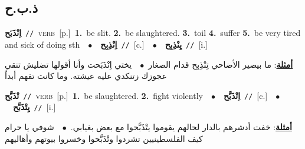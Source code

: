 \documentclass[10pt,a4paper,twoside]{article} %
\begin{document}
\begin{multicols}{2}
\vspace{-3mm}
\subsection*{\color{blue}\foreignlanguage{arabic}{ذ.ب.ح}\color{blue}{}} 

{\setlength\topsep{0pt}\textbf{\foreignlanguage{arabic}{اِنْذَبَح}}\ {\color{gray}\texttt{//}\color{black}}\ \textsc{verb}\ [p.]\ \textbf{1.}~be slit.  \textbf{2.}~be slaughtered.  \textbf{3.}~toil  \textbf{4.}~suffer  \textbf{5.}~be very tired and sick of doing sth\ \ $\bullet$\ \ \setlength\topsep{0pt}\textbf{\foreignlanguage{arabic}{اِنْذِبِح}}\ {\color{gray}\texttt{//}\color{black}}\ [c.]\ \ $\bullet$\ \ \setlength\topsep{0pt}\textbf{\foreignlanguage{arabic}{يِنْذِبِح}}\ {\color{gray}\texttt{//}\color{black}}\ [i.]\  \begin{flushright}\color{gray}\foreignlanguage{arabic}{\textbf{\underline{\foreignlanguage{arabic}{أمثلة}}}: ما بيصير الأضاحي تِنْذِبِح قدام الصغار\ $\bullet$\ \  يختي اِنْذَبَحت وأنا أقولها تضليش تنقي عجوزك زتنكدي عليه عيشته. وما كانت تفهم أبداً}\end{flushright}\color{black}} \vspace{2mm}

{\setlength\topsep{0pt}\textbf{\foreignlanguage{arabic}{تْذَبَّح}}\ {\color{gray}\texttt{//}\color{black}}\ \textsc{verb}\ [p.]\ \textbf{1.}~be slaughtered.  \textbf{2.}~fight violently\ \ $\bullet$\ \ \setlength\topsep{0pt}\textbf{\foreignlanguage{arabic}{اِتْذَبَّح}}\ {\color{gray}\texttt{//}\color{black}}\ [c.]\ \ $\bullet$\ \ \setlength\topsep{0pt}\textbf{\foreignlanguage{arabic}{يِتْذَبَّح}}\ {\color{gray}\texttt{//}\color{black}}\ [i.]\  \begin{flushright}\color{gray}\foreignlanguage{arabic}{\textbf{\underline{\foreignlanguage{arabic}{أمثلة}}}: خفت أدشرهم بالدار لحالهم يقوموا يتْذَبَّحوا مع بعض بغيابي.\ $\bullet$\ \  شوفي يا حرام كيف الفلسطينيين تشردوا وتْذَبَّحوا وخسروا بيوتهم وأهاليهم}\end{flushright}\color{black}} \vspace{2mm}


\end{multicols}
\end{document}
